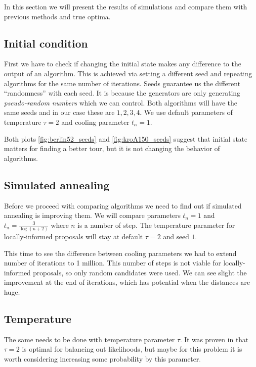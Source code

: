 In this section we will present the results of simulations and compare them with previous methods and true optima.

\subsection{Initial condition}
	First we have to check if changing the initial state makes any difference to the output of an algorithm. This is achieved via setting a different seed and repeating algorithms for the same number of iterations. Seeds guarantee us the different ``randomness'' with each seed. It is because the generators are only generating \textit{pseudo-random numbers} which we can control. Both algorithms will have the same seeds and in our case these are $1,2,3,4$. We use default parameters of temperature $\tau=2$ and cooling parameter $t_n=1$.
	

	Both plots \ref{fig:berlin52_seeds} and \ref{fig:kroA150_seeds} suggest that initial state matters for finding a better tour, but it is not changing the behavior of algorithms.
	
\subsection{Simulated annealing}
	Before we proceed with comparing algorithms we need to find out if simulated annealing is improving them. We will compare parameters $t_n=1$ and $t_n= \frac{3}{\log(n+2)}$ where $n$ is a number of step. The temperature parameter for locally-informed proposals will stay at default $\tau=2$ and seed $1$.
	
	
	
	This time to see the difference between cooling parameters we had to extend number of iterations to 1 million. This number of steps is not viable for locally-informed proposals, so only random candidates were used. We can see slight the improvement at the end of iterations, which has potential when the distances are huge. 
	
\subsection{Temperature}
	The same needs to be done with temperature parameter $\tau$. It was proven in \cite{zanella2020informed} that $\tau=2$ is optimal for balancing out likelihoods, but maybe for this problem it is worth considering increasing some probability by this parameter.
	
